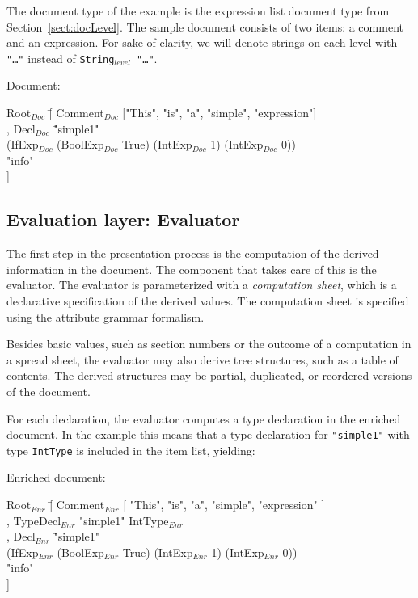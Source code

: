 The document type of the example is the expression list document type from Section~\ref{sect:docLevel}. The sample document consists of two items: a comment and an expression. For sake of clarity, we will denote strings on each level with {\tt "\dots"} instead of {\tt String$_{level}$ "\dots"}. 

Document:
\small \ttfamily
\begin{tabbing}
Root$_{Doc}$ \= [ Comment$_{Doc}$ ["This", "is", "a", "simple", "expression"] \\
       \> , Decl$_{Doc}$ \= "simple1" \\
       \>                        \>(IfExp$_{Doc}$ (BoolExp$_{Doc}$ True) (IntExp$_{Doc}$ 1) (IntExp$_{Doc}$ 0))\\
       \>                        \> "info"\\
       \> ] 
\end{tabbing}
\rmfamily \normalsize

\subsection{Evaluation layer: Evaluator} \label{sect:evaluator}

The first step in the presentation process is the computation of the derived information in the document. The component that takes care of this is the evaluator. The evaluator is parameterized with a {\em computation sheet}, which is a declarative specification of the derived values. The computation sheet is specified using the attribute grammar formalism.

Besides basic values, such as section numbers or the outcome of a computation in a spread sheet, the evaluator may also derive tree structures, such as a table of contents. The derived structures may be partial, duplicated, or reordered versions of the document. 

 For each declaration, the evaluator computes a type declaration in the enriched document. In the example this means that a type declaration for \verb|"simple1"| with type {\tt IntType} is included in the item list, yielding:

Enriched document:
\small \ttfamily
\begin{tabbing}
Root$_{Enr}$ \= [ Comment$_{Enr}$ [ "This", "is", "a", "simple", "expression" ]\\
       \> , TypeDecl$_{Enr}$ "simple1" IntType$_{Enr}$\\
       \> , Decl$_{Enr}$ \= "simple1"\\
       \>                       \> (IfExp$_{Enr}$ (BoolExp$_{Enr}$ True) (IntExp$_{Enr}$ 1) (IntExp$_{Enr}$ 0)) \\
       \>                        \> "info"\\
       \> ] 
\end{tabbing}
\rmfamily \normalsize

